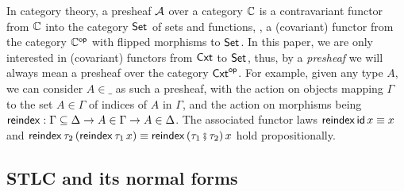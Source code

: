 \documentclass[sigplan,screen,fleqn,review]{acmart} %
\begin{document}
In category theory, a presheaf $\mathcal{A}$ over a category $\mathbb{C}$ is a contravariant
functor from $\mathbb{C}$ into the category $\mathsf{Set}_{}$ of sets and functions, \ie, a
(covariant) functor from the category $\mathbb{C}^{\mathsf{op}}$ with flipped morphisms
to $\mathsf{Set}_{}$.
In this paper, we are only interested in (covariant) functors from $\mathsf{Cxt}$ to
$\mathsf{Set}_{}$, thus,
by a \emph{presheaf} we will always mean a presheaf over the category $\mathsf{Cxt}^{\mathsf{op}}$.
For example, given any type $A$, we can
consider $A{\in}\_$ as such a presheaf, with the action on objects mapping $\Gamma$
to the set $A \in \Gamma$ of indices of $A$ in $\Gamma$, and the action on morphisms
being
$\mathsf{reindex} : \Gamma \subseteq \Delta \to A \in \Gamma \to A \in
\Delta$.  The associated functor laws $\mathsf{reindex}\,\mathsf{id}\,x \equiv x$ and
$\mathsf{reindex}\,\tau_2\,(\mathsf{reindex}\,\tau_1\,x) \equiv \mathsf{reindex}\,(\tau_1 \fatsemi
\tau_2)\,x$ hold propositionally.

\subsection{STLC and its normal forms}
\label{sec:stlc}
\end{document}
